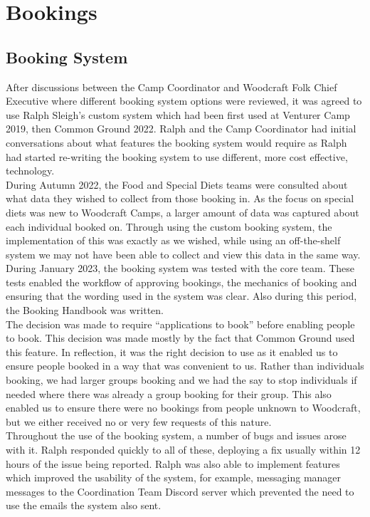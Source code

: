 \chapter{Bookings}
\section{Booking System}
After discussions between the Camp Coordinator and Woodcraft Folk Chief Executive where different booking system options were reviewed, it was agreed to use Ralph Sleigh's custom system which had been first used at Venturer Camp 2019, then Common Ground 2022. Ralph and the Camp Coordinator had initial conversations about what features the booking system would require as Ralph had started re-writing the booking system to use different, more cost effective, technology.\\

During Autumn 2022, the Food and Special Diets teams were consulted about what data they wished to collect from those booking in. As the focus on special diets was new to Woodcraft Camps, a larger amount of data was captured about each individual booked on. Through using the custom booking system, the implementation of this was exactly as we wished, while using an off-the-shelf system we may not have been able to collect and view this data in the same way.\\

During January 2023, the booking system was tested with the core team. These tests enabled the workflow of approving bookings, the mechanics of booking and ensuring that the wording used in the system was clear. Also during this period, the Booking Handbook was written.\\

The decision was made to require ``applications to book'' before enabling people to book. This decision was made mostly by the fact that Common Ground used this feature. In reflection, it was the right decision to use as it enabled us to ensure people booked in a way that was convenient to us. Rather than individuals booking, we had larger groups booking and we had the say to stop individuals if needed where there was already a group booking for their group. This also enabled us to ensure there were no bookings from people unknown to Woodcraft, but we either received no or very few requests of this nature.\\

Throughout the use of the booking system, a number of bugs and issues arose with it. Ralph responded quickly to all of these, deploying a fix usually within 12 hours of the issue being reported. Ralph was also able to implement features which improved the usability of the system, for example, messaging manager messages to the Coordination Team Discord server which prevented the need to use the emails the system also sent.\\

